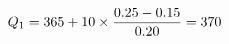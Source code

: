 \documentclass[preview]{standalone}
\begin{document}
\begin{align*}
\special{dvisvgm:raw <g id='unique000'>}Q_1=365+10\times\frac{0.25-0.15}{0.20}=370\special{dvisvgm:raw </g>}
\end{align*}
\end{document}
